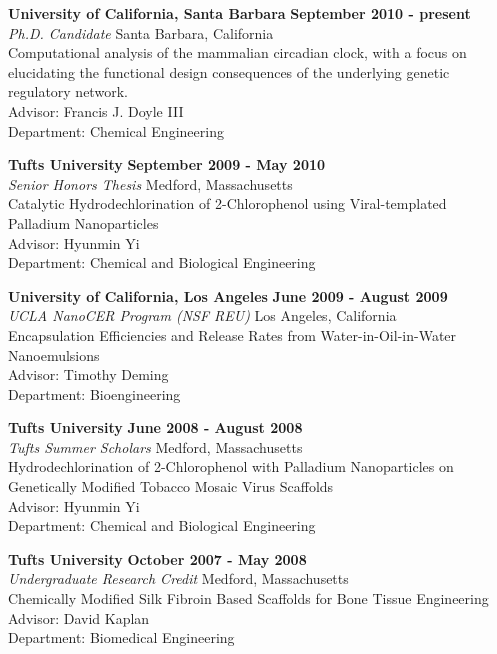 {{\bf University of California, Santa Barbara} \hfill {\bf September 2010 - present}\\
{\em Ph.D. Candidate} \hfill Santa Barbara, California\\
Computational analysis of the mammalian circadian clock, with a focus on
elucidating the functional design consequences of the underlying genetic
regulatory network.\\
Advisor: Francis J. Doyle III \\
Department: Chemical Engineering

{\bf Tufts University} \hfill {\bf September 2009 - May 2010}\\
{\em Senior Honors Thesis} \hfill Medford, Massachusetts\\
Catalytic Hydrodechlorination of 2-Chlorophenol using Viral-templated Palladium Nanoparticles\\
Advisor: Hyunmin Yi \\
Department: Chemical and Biological Engineering

{\bf University of California, Los Angeles} \hfill {\bf June 2009 - August 2009}\\
{\em UCLA NanoCER Program (NSF REU)} \hfill Los Angeles, California\\
Encapsulation Efficiencies and Release Rates from Water-in-Oil-in-Water Nanoemulsions\\
Advisor: Timothy Deming\\
Department: Bioengineering

{\bf Tufts University} \hfill {\bf June 2008 - August 2008}\\
{\em Tufts Summer Scholars} \hfill Medford, Massachusetts\\
Hydrodechlorination of 2-Chlorophenol with Palladium Nanoparticles on Genetically Modified Tobacco Mosaic Virus Scaffolds\\
Advisor: Hyunmin Yi\\
Department: Chemical and Biological Engineering

{\bf Tufts University} \hfill {\bf October 2007 - May 2008}\\
{\em Undergraduate Research Credit} \hfill Medford, Massachusetts\\
Chemically Modified Silk Fibroin Based Scaffolds for Bone Tissue Engineering\\
Advisor: David Kaplan\\
Department: Biomedical Engineering

}
